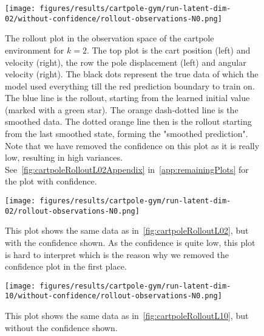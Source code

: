 		\begin{figure}
			\centering
			\texttt{[image: figures/results/cartpole-gym/run-latent-dim-02/without-confidence/rollout-observations-N0.png]}
			\caption[Rollout of the cartpole experiment for 2 latent dimensions without confidence]{The rollout plot in the observation space of the cartpole environment for \(k = 2\). The top plot is the cart position (left) and velocity (right), the row the pole displacement (left) and angular velocity (right). The black dots represent the true data of which the model used everything till the red prediction boundary to train on. The blue line is the rollout, starting from the learned initial value (marked with a green star). The orange dash-dotted line is the smoothed data. The dotted orange line then is the rollout starting from the last smoothed state, forming the "smoothed prediction". Note that we have removed the confidence on this plot as it is really low, resulting in high variances. See~\autoref{fig:cartpoleRolloutL02Appendix} in~\autoref{app:remainingPlots} for the plot with confidence.}
			\label{fig:cartpoleRolloutL02}
		\end{figure}
		\begin{figure}
			\centering
			\texttt{[image: figures/results/cartpole-gym/run-latent-dim-02/rollout-observations-N0.png]}
			\caption[Rollout of the cartpole experiment for 2 latent dimensions with confidence]{This plot shows the same data as in~\autoref{fig:cartpoleRolloutL02}, but with the confidence shown. As the confidence is quite low, this plot is hard to interpret which is the reason why we removed the confidence plot in the first place.}
			\label{fig:cartpoleRolloutL02Appendix}
		\end{figure}

		\begin{figure}
			\centering
			\texttt{[image: figures/results/cartpole-gym/run-latent-dim-10/without-confidence/rollout-observations-N0.png]}
			\caption[Rollout of the cartpole experiment for 10 latent dimensions without confidence]{This plot shows the same data as in~\autoref{fig:cartpoleRolloutL10}, but without the confidence shown.}
			\label{fig:cartpoleRolloutL10Appendix}
		\end{figure}

